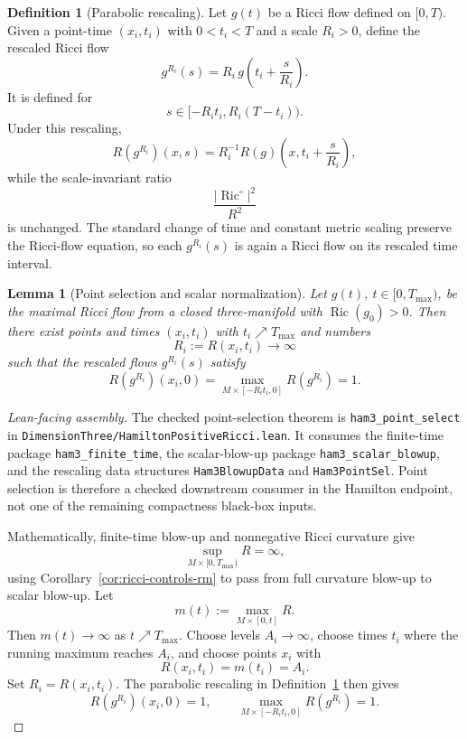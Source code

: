 \documentclass[11pt]{article}
\theoremstyle{plain}
\newtheorem{lemma}[theorem]{Lemma}
\theoremstyle{definition}
\newtheorem{definition}[theorem]{Definition}
\theoremstyle{remark}
\newcommand{\Ric}{\operatorname{Ric}}
\newcommand{\norm}[1]{\left|#1\right|}
\newcommand{\leanref}[1]{\nolinkurl{#1}}
\newcommand{\leanfile}[1]{\nolinkurl{#1}}
\newcommand{\rffile}[1]{\leanfile{#1}}
\begin{document}
\begin{definition}[Parabolic rescaling]
\label{def:parabolic-rescaling}
Let $g(t)$ be a Ricci flow defined on $[0,T)$. Given a point-time
$(x_i,t_i)$ with $0<t_i<T$ and a scale $R_i>0$, define the rescaled Ricci
flow
\[
g^{R_i}(s)=R_i\,g\left(t_i+\frac{s}{R_i}\right).
\]
It is defined for
\[
s\in[-R_it_i,R_i(T-t_i)).
\]
Under this rescaling,
\[
R(g^{R_i})(x,s)=R_i^{-1}R(g)\left(x,t_i+\frac{s}{R_i}\right),
\]
while the scale-invariant ratio
\[
\frac{\norm{\Ric^\circ}^2}{R^2}
\]
is unchanged.  The standard change of time and constant metric scaling preserve
the Ricci-flow equation, so each \(g^{R_i}(s)\) is again a Ricci flow on its
rescaled time interval.
\end{definition}

\begin{lemma}[Point selection and scalar normalization]
\label{lem:point-selection-rescaling}
Let $g(t)$, $t\in[0,T_{\max})$, be the maximal Ricci flow from a closed
three-manifold with $\Ric(g_0)>0$. Then there exist points and times
$(x_i,t_i)$ with $t_i\nearrow T_{\max}$ and numbers
\[
R_i:=R(x_i,t_i)\to\infty
\]
such that the rescaled flows $g^{R_i}(s)$ satisfy
\[
R(g^{R_i})(x_i,0)=
\max_{M\times[-R_it_i,0]}R(g^{R_i})
=1.
\]
\end{lemma}

\begin{proof}[Lean-facing assembly]
The checked point-selection theorem is \leanref{ham3_point_select} in
\rffile{DimensionThree/HamiltonPositiveRicci.lean}.  It consumes the finite-time package
\leanref{ham3_finite_time}, the scalar-blow-up package
\leanref{ham3_scalar_blowup}, and the rescaling data structures
\leanref{Ham3BlowupData} and \leanref{Ham3PointSel}.  Point selection is
therefore a checked downstream consumer in the Hamilton endpoint, not one of
the remaining compactness black-box inputs.

Mathematically, finite-time blow-up and nonnegative Ricci curvature give
\[
\sup_{M\times[0,T_{\max})}R=\infty,
\]
using Corollary~\ref{cor:ricci-controls-rm} to pass from full curvature blow-up
to scalar blow-up.  Let
\[
  m(t):=\max_{M\times[0,t]}R.
\]
Then \(m(t)\to\infty\) as \(t\nearrow T_{\max}\).  Choose levels
\(A_i\to\infty\), choose times \(t_i\) where the running maximum reaches
\(A_i\), and choose points \(x_i\) with
\[
  R(x_i,t_i)=m(t_i)=A_i.
\]
Set \(R_i=R(x_i,t_i)\).  The parabolic rescaling in
Definition~\ref{def:parabolic-rescaling} then gives
\[
  R(g^{R_i})(x_i,0)=1,
  \qquad
  \max_{M\times[-R_it_i,0]}R(g^{R_i})=1.
\]
\end{proof}
\end{document}
